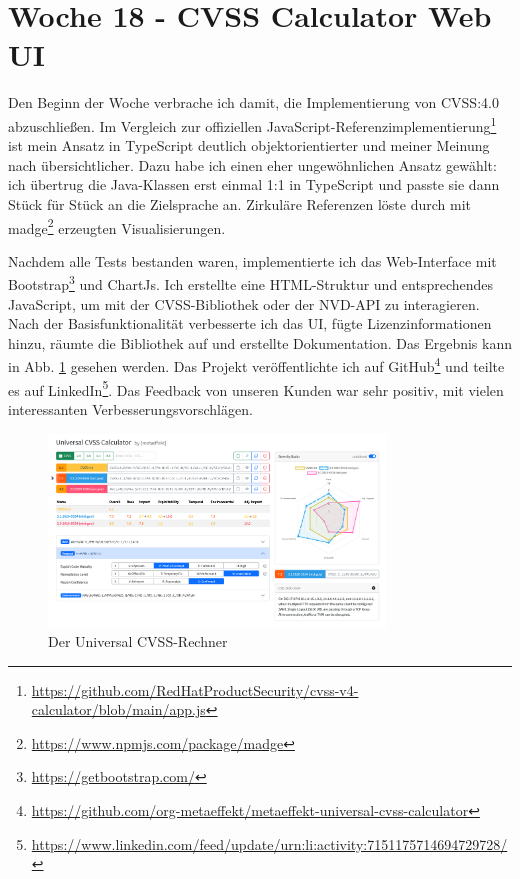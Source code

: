 \section{Woche 18 - CVSS Calculator Web UI} \label{sec:bericht-wo-18}


\lweekdaymarginpar{\weekdayMondayShort, \weekdayTuesdayShort}

Den Beginn der Woche verbrache ich damit, die Implementierung von CVSS:4.0 abzuschließen.
Im Vergleich zur offiziellen JavaScript-Referenzimplementierung\footnote{\url{https://github.com/RedHatProductSecurity/cvss-v4-calculator/blob/main/app.js}} ist mein Ansatz in TypeScript deutlich objektorientierter und meiner Meinung nach übersichtlicher.
Dazu habe ich einen eher ungewöhnlichen Ansatz gewählt:
ich übertrug die Java-Klassen erst einmal 1:1 in TypeScript und passte sie dann Stück für Stück an die Zielsprache an.
Zirkuläre Referenzen löste durch mit madge\footnote{\url{https://www.npmjs.com/package/madge}} erzeugten Visualisierungen.

\sweekdaymarginpar{\weekdayWednesdayShort\ - \weekdayFridayShort}

Nachdem alle Tests bestanden waren, implementierte ich das Web-Interface mit Bootstrap\footnote{\url{https://getbootstrap.com/}} und ChartJs.
Ich erstellte eine HTML-Struktur und entsprechendes JavaScript, um mit der CVSS-Bibliothek oder der NVD-API zu interagieren.
Nach der Basisfunktionalität verbesserte ich das UI, fügte Lizenzinformationen hinzu, räumte die Bibliothek auf und erstellte Dokumentation.
Das Ergebnis kann in Abb. \ref{fig:metaeffekt-cvss-calculator-ui} gesehen werden.
Das Projekt veröffentlichte ich auf GitHub\footnote{\url{https://github.com/org-metaeffekt/metaeffekt-universal-cvss-calculator}} und teilte es auf LinkedIn\footnote{\url{https://www.linkedin.com/feed/update/urn:li:activity:7151175714694729728/}}.
Das Feedback von unseren Kunden war sehr positiv, mit vielen interessanten Verbesserungsvorschlägen.

\begin{figure}[htbp] %
    \centering
    \includegraphics[width=0.8\textwidth, keepaspectratio]{res/img/metaeffekt-cvss-calculator-ui}
    \caption{Der {\metaeffekt} Universal CVSS-Rechner}
    \label{fig:metaeffekt-cvss-calculator-ui}
\end{figure}

